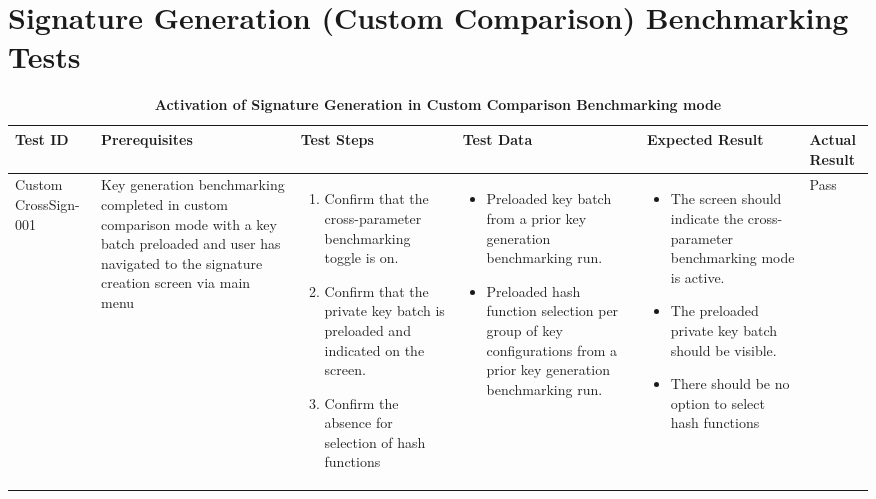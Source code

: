 \documentclass[]{final_report}
\theoremstyle{definition}
\begin{document}
\section*{Signature Generation (Custom Comparison) Benchmarking Tests} 

\begin{longtable}{|p{1.5cm}|p{2.5cm}|p{3.5cm}|p{2.5cm}|p{3cm}|p{2cm}|}
  \caption{\textbf{Activation of Signature Generation in Custom Comparison Benchmarking mode}} 
  \hline
  \textbf{Test ID} & \textbf{Prerequisites} & \textbf{Test Steps} & \textbf{Test Data} & \textbf{Expected Result} & \textbf{Actual Result} \\
    \hline
Custom
CrossSign-001 & Key generation benchmarking completed in custom comparison mode with a key batch preloaded and user has navigated to the signature creation screen via main menu &
\begin{enumerate}
\item Confirm that the cross-parameter benchmarking toggle is on.
\item Confirm that the private key batch is preloaded and indicated on the screen.
\item Confirm the absence for selection of hash functions
\end{enumerate} &
\begin{itemize}
\item Preloaded key batch from a prior key generation benchmarking run.
\item Preloaded hash function selection per group of key configurations from a prior key generation benchmarking run.
\end{itemize} &
\begin{itemize}
\item The screen should indicate the cross-parameter benchmarking mode is active.
\item The preloaded private key batch should be visible.
\item There should be no option to select hash functions
\end{itemize} &Pass \\
\hline
  
\end{longtable}
\end{document}
